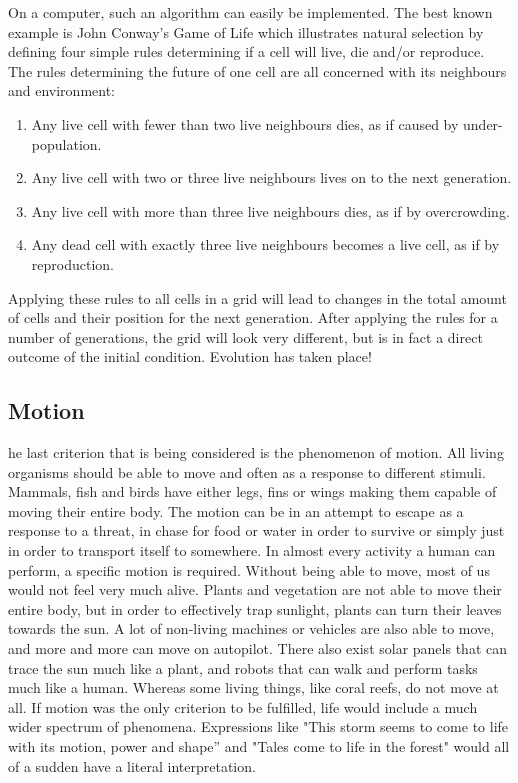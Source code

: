 On a computer, such an algorithm can easily be implemented.
The best known example is John Conway's Game of Life \cite{Conway} which illustrates natural selection by defining four simple rules determining if a cell will live, die and/or reproduce.
The rules determining the future of one cell are all concerned with its neighbours and environment:
\begin{enumerate}
\item Any live cell with fewer than two live neighbours dies, as if caused by under-population.
\item Any live cell with two or three live neighbours lives on to the next generation.
\item Any live cell with more than three live neighbours dies, as if by overcrowding.
\item Any dead cell with exactly three live neighbours becomes a live cell, as if by reproduction.
\end{enumerate}
Applying these rules to all cells in a grid will lead to changes in the total amount of cells and their position for the next generation.
After applying the rules for a number of generations, the grid will look very different, but is in fact a direct outcome of the initial condition.
Evolution has taken place!

\subsection*{Motion}
he last criterion that is being considered is the phenomenon of motion.
All living organisms should be able to move and often as a response to different stimuli.
Mammals, fish and birds have either legs, fins or wings making them capable of moving their entire body.
The motion can be in an attempt to escape as a response to a threat, in chase for food or water in order to survive or simply just in order to transport itself to somewhere.
In almost every activity a human can perform, a specific motion is required.
Without being able to move, most of us would not feel very much alive.
Plants and vegetation are not able to move their entire body, but in order to effectively trap sunlight, plants can turn their leaves towards the sun.
A lot of non-living machines or vehicles are also able to move, and more and more can move on autopilot.
There also exist solar panels that can trace the sun much like a plant, and robots that can walk and perform tasks much like a human.
Whereas some living things, like coral reefs, do not move at all.
If motion was the only criterion to be fulfilled, life would include a much wider spectrum of phenomena.
Expressions like "This storm seems to come to life with its motion, power and shape'' and "Tales come to life in the forest" would all of a sudden have a literal interpretation. 

